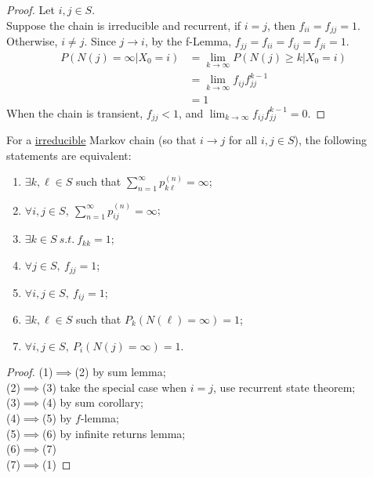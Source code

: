 \documentclass{article}
\newcommand{\upn}[0]{^{(n)}}
\begin{document}
    \begin{proof}
    	Let $i, j \in S$. \\
    	Suppose the chain is irreducible and recurrent, if $i = j$, then $f_{ii} = f_{jj} = 1$. \\
    	Otherwise, $i \neq j$. Since $j \to i$, by the f-Lemma, $f_{jj} = f_{ii} = f_{ij} = f_{ji} = 1$.
    	\begin{align}
    		P(N(j) = \infty | X_0 = i)
    		&= \lim_{k \to \infty} P(N(j) \geq k | X_0 = i) \\
    		&= \lim_{k \to \infty} f_{ij} f_{jj}^{k-1} \\
    		&= 1
    	\end{align}
    	When the chain is transient, $f_{jj} < 1$, and $\lim_{k \to \infty} f_{ij} f_{jj}^{k-1} = 0$.
    \end{proof}
    
    \begin{theorem}
    	For a \ul{irreducible} Markov chain (so that $i \to j$ for all $i, j \in S$), the following statements are equivalent:
    	\begin{enumerate}[(1)]
    		\item $\exists k, \ell \in S$ such that $\sum_{n=1}^\infty p_{k \ell}\upn = \infty$;
    		\item $\forall i,j \in S,\ \sum_{n=1}^\infty p_{ij}\upn = \infty$;
    		\item $\exists k \in S\ s.t.\ f_{kk} = 1$;
    		\item $\forall j \in S,\ f_{jj} = 1$;
    		\item $\forall i,j \in S,\ f_{ij} = 1$;
    		\item $\exists k, \ell \in S$ such that $P_k(N(\ell) = \infty) = 1$;
    		\item $\forall i, j \in S,\ P_i(N(j) = \infty) = 1$.
    	\end{enumerate}
    \end{theorem}

	\begin{proof}
		(1)$\implies$(2) by sum lemma; \\
		(2)$\implies$(3) take the special case when $i = j$, use recurrent state theorem; \\
		(3)$\implies$(4) by sum corollary; \\
		(4)$\implies$(5) by $f$-lemma; \\
		(5)$\implies$(6) by infinite returns lemma; \\
		(6)$\implies$(7)  \\
		(7)$\implies$(1)
	\end{proof}
\end{document}
